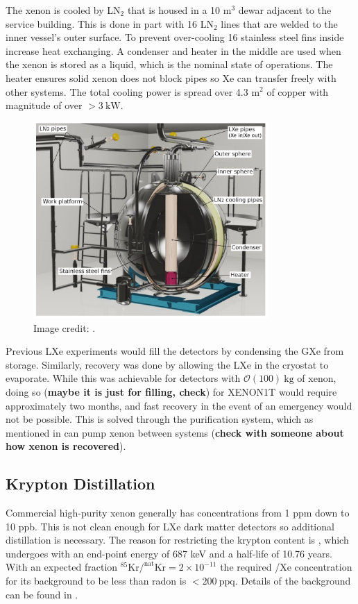 The xenon is cooled by LN$_2$ that is housed in a 10 m$^3$ dewar adjacent to the service building.  This is done in part with 16 LN$_2$
lines that are welded to the inner vessel's outer surface.  To prevent over-cooling 16 stainless steel fins inside increase heat
exchanging.  A condenser and heater in the middle are used when the xenon is stored as a liquid, which is the nominal state of
operations.  The heater ensures solid xenon does not block pipes so Xe can transfer freely with other systems.  The total cooling power is
spread over 4.3 m$^2$ of copper with magnitude of over $>3\ \mathrm{kW}$.

\begin{figure}
\centering
\includegraphics[width=0.8\textwidth]{ReStoX}
\caption{Image credit: .}
\label{fig:xenon1t_restox_pic}
\end{figure}

Previous LXe experiments would fill the detectors by condensing the GXe from storage.  Similarly, recovery was done by allowing the LXe
in the cryostat to evaporate.  While this was achievable for detectors with $\mathcal{O}(100)\ \mathrm{kg}$ of xenon, doing so
(\textbf{maybe it is just for filling, check}) for XENON1T would require approximately two months, and fast recovery in the event of an
emergency would not be possible.  This is solved through the purification system, which as mentioned in  can
pump xenon between systems (\textbf{check with someone about how xenon is recovered}).



\subsection{Krypton Distillation}
\label{subsec:xenon1t_kr_dist}
Commercial high-purity xenon generally has  concentrations from 1 ppm down to 10 ppb.  This is not clean enough for LXe dark matter
detectors so additional distillation is necessary.  The reason for restricting the
krypton content is , which undergoes \betadecay with an end-point energy of 687 keV and a half-life of 10.76 years.  With
an expected fraction $\mathrm{^{85}Kr / ^{nat}Kr = 2 \times 10^{-11}}$ the required /Xe concentration for its background to be
less than radon is $< 200\ \mathrm{ppq}$.  Details of the  background can be found in .

